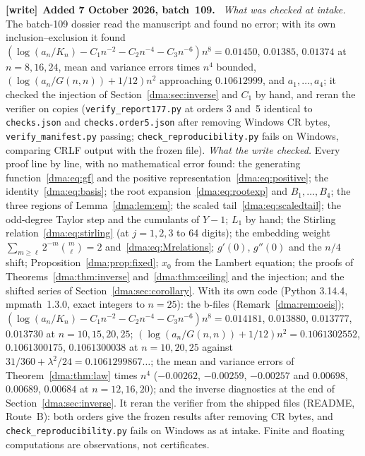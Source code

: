 \documentclass[11pt,letterpaper]{article}
\theoremstyle{remark}\newtheorem{remark}[theorem]{Remark}
\newcommand{\file}[1]{\nolinkurl{#1}}
\newenvironment{writenote}[1][]{\par\smallskip\begingroup\small
 \noindent\textbf{[write]}\if\relax\detokenize{#1}\relax\else~\textbf{#1.}\fi\ }%
 {\par\endgroup\smallskip}
\begin{document}
\begin{writenote}[Added 7 October 2026, batch~109]
\emph{What was checked at intake.} The batch-109 dossier read the manuscript
and found no error; with its own inclusion--exclusion it found
$(\log(a_n/K_n)-C_1n^{-2}-C_2n^{-4}-C_3n^{-6})n^8=0.01450$, $0.01385$,
$0.01374$ at $n=8,16,24$, mean and variance errors times $n^4$ bounded,
$(\log(a_n/G(n,n))+1/12)n^2$ approaching $0.10612999$, and $a_1,\dots,a_4$;
it checked the injection of Section~\ref{dma:sec:inverse} and $C_1$ by hand,
and reran the verifier on copies (\file{verify\_report177.py} at orders 3
and~5 identical to \file{checks.json} and \file{checks.order5.json} after
removing Windows CR bytes, \file{verify\_manifest.py} passing;
\file{check\_reproducibility.py} fails on Windows, comparing CRLF output with
the frozen file). \emph{What the write checked.} Every proof line by line,
with no mathematical error found: the generating function~\eqref{dma:eq:gf}
and the positive representation~\eqref{dma:eq:positive}; the
identity~\eqref{dma:eq:basis}; the root expansion~\eqref{dma:eq:rootexp} and
$B_1,\dots,B_4$; the three regions of Lemma~\ref{dma:lem:em}; the scaled
tail~\eqref{dma:eq:scaledtail}; the odd-degree Taylor step and the cumulants
of $Y-1$; $L_1$ by hand; the Stirling relation~\eqref{dma:eq:stirling} (at
$j=1,2,3$ to 64 digits); the embedding weight $\sum_{m\ge\ell}2^{-m}\binom
m\ell=2$ and~\eqref{dma:eq:Mrelations}; $g'(0)$, $g''(0)$ and the $n/4$
shift; Proposition~\ref{dma:prop:fixed}; $x_0$ from the Lambert equation;
the proofs of Theorems~\ref{dma:thm:inverse} and~\ref{dma:thm:ceiling} and the
injection; and the shifted series of Section~\ref{dma:sec:corollary}. With its
own code (Python 3.14.4, mpmath~1.3.0, exact integers to $n=25$): the
b-files (Remark~\ref{dma:rem:oeis}); $(\log(a_n/K_n)-C_1n^{-2}-C_2n^{-4}-C_3n^{-6})n^8=0.014181$,
$0.013880$, $0.013777$, $0.013730$ at $n=10,15,20,25$;
$(\log(a_n/G(n,n))+1/12)n^2=0.1061302552$, $0.1061300175$, $0.1061300038$ at
$n=10,20,25$ against $31/360+\lambda^2/24=0.1061299867\ldots$; the mean and
variance errors of Theorem~\ref{dma:thm:law} times $n^4$ ($-0.00262$,
$-0.00259$, $-0.00257$ and $0.00698$, $0.00689$, $0.00684$ at $n=12,16,20$);
and the inverse diagnostics at the end of Section~\ref{dma:sec:inverse}. It
reran the verifier from the shipped files (README, Route~B): both orders give
the frozen results after removing CR bytes, and
\file{check\_reproducibility.py} fails on Windows as at intake. Finite and
floating computations are observations, not certificates.


\end{writenote}
\end{document}
